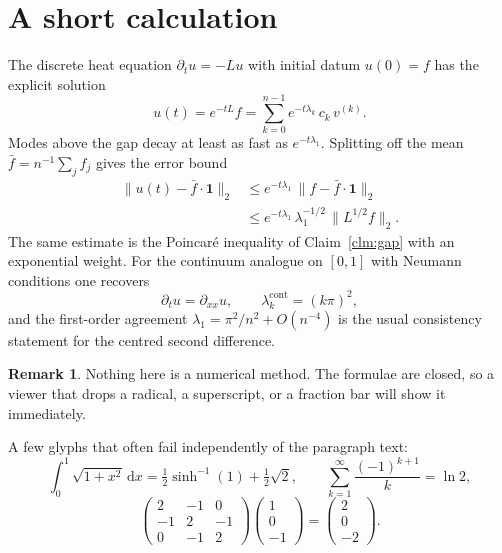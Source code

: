 \documentclass[10pt,twocolumn]{article}
\theoremstyle{definition}
\newtheorem{remark}{Remark}
\begin{document}
\section{A short calculation}
\label{sec:calc}
The discrete heat equation \(\partial_t u = -Lu\) with initial datum \(u(0)=f\) has the explicit solution
\begin{equation}
\label{eq:heat}
u(t) = e^{-tL}f = \sum_{k=0}^{n-1} e^{-t\lambda_k}\, c_k\, v^{(k)}.
\end{equation}
Modes above the gap decay at least as fast as \(e^{-t\lambda_1}\). Splitting off the mean \(\bar f = n^{-1}\sum_j f_j\) gives the error bound
\begin{align}
\label{eq:decay}
\|u(t)-\bar f\cdot\mathbf{1}\|_2
&\le e^{-t\lambda_1}\,\|f-\bar f\cdot\mathbf{1}\|_2 \\
&\le e^{-t\lambda_1}\,\lambda_1^{-1/2}\,\|L^{1/2}f\|_2. \nonumber
\end{align}
The same estimate is the Poincaré inequality of Claim~\ref{clm:gap} with an exponential weight. For the continuum analogue on \([0,1]\) with Neumann conditions one recovers
\begin{equation}
\label{eq:continuum}
\partial_t u = \partial_{xx} u,
\qquad
\lambda_k^{\mathrm{cont}} = (k\pi)^2,
\end{equation}
and the first-order agreement \(\lambda_1 = \pi^2/n^2 + O(n^{-4})\) is the usual consistency statement for the centred second difference.

\begin{remark}
Nothing here is a numerical method. The formulae are closed, so a viewer that drops a radical, a superscript, or a fraction bar will show it immediately.
\end{remark}

A few glyphs that often fail independently of the paragraph text:
\begin{equation}
\label{eq:glyphs}
\int_{0}^{1}\!\sqrt{1+x^2}\,\mathrm{d}x
= \tfrac12\sinh^{-1}(1)+\tfrac12\sqrt{2},
\qquad
\sum_{k=1}^{\infty}\frac{(-1)^{k+1}}{k}=\ln 2,
\end{equation}
\begin{equation}
\label{eq:matrix}
\begin{pmatrix} 2 & -1 & 0 \\ -1 & 2 & -1 \\ 0 & -1 & 2 \end{pmatrix}
\begin{pmatrix} 1 \\ 0 \\ -1 \end{pmatrix}
=
\begin{pmatrix} 2 \\ 0 \\ -2 \end{pmatrix}.
\end{equation}
\end{document}
